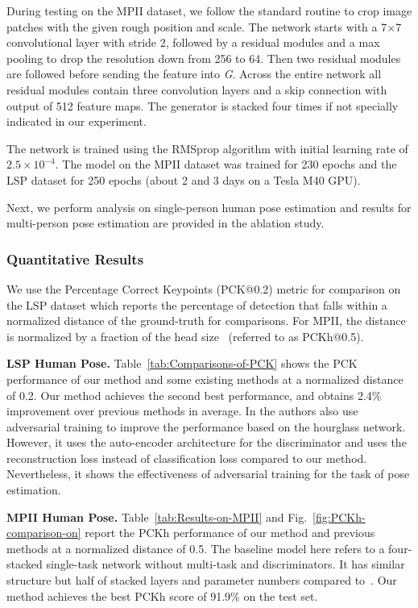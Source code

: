 \documentclass[10pt,journal,compsoc]{IEEEtran}
\begin{document}
During testing on the MPII dataset, we follow the standard routine to crop image patches with the given rough position and scale. The network starts with a 7$\times$7 convolutional layer with stride 2, followed by a residual modules and a max pooling to drop the resolution down from 256 to 64. Then two residual modules are followed before sending the feature into \textit{G}. Across the entire network all residual modules contain three convolution layers and a skip connection with output of 512 feature maps. The generator is stacked four times if not specially indicated in our experiment.

The network is trained using the RMSprop algorithm with initial learning rate of $2.5\times 10 ^{-4}$. The model on the MPII dataset was trained for 230 epochs and the LSP dataset for 250 epochs (about 2 and 3 days on a Tesla M40 GPU).

Next, we  perform  analysis on single-person human pose estimation and results for multi-person pose estimation are provided in the ablation study.

\subsubsection{Quantitative Results}\label{subsec:Results}

We use the Percentage Correct Keypoints (PCK@0.2) \cite{yang2013articulated} metric for comparison on the LSP dataset which reports the percentage of detection that falls within a normalized distance of the ground-truth for comparisons. For MPII, the distance is normalized by a fraction of the head size~\cite{conf/cvpr/AndrilukaPGS14} (referred to as PCKh@0.5). %


\noindent \textbf{LSP Human Pose.} Table~\ref{tab:Comparisons-of-PCK} shows the PCK performance of our method and some existing methods at a normalized distance of 0.2. Our method achieves the second best performance, and obtains 2.4\% improvement over previous methods in average.
In \cite{chou2017self} the authors also use adversarial training to improve the performance based on the
hourglass network. However, it uses the auto-encoder architecture for the discriminator and uses the reconstruction loss instead of classification loss compared to our method. Nevertheless,
it  shows the effectiveness of adversarial training for the task of pose estimation.





\noindent \textbf{MPII Human Pose.} Table~\ref{tab:Results-on-MPII} and Fig.~\ref{fig:PCKh-comparison-on} report
the PCKh performance of our method and previous methods at a normalized distance of 0.5. The
baseline model here refers to a four-stacked single-task network without multi-task and discriminators.
It has similar structure but half of stacked layers and parameter numbers compared to~\cite{conf/eccv/NewellYD16}. Our method achieves the best PCKh score of 91.9\% on the test set.
\end{document}
